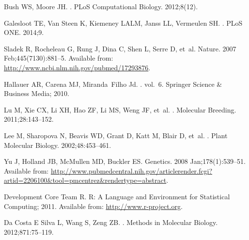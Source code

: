 \documentclass[10pt,letterpaper]{article}
\begin{document}
\begin{thebibliography}{}
Bush WS, Moore JH.
.
\newblock PLoS Computational Biology. 2012;8(12).

Galesloot TE, {Van Steen} K, Kiemeney LALM, Janss LL, Vermeulen SH.
.
\newblock PLoS ONE. 2014;9.

Sladek R, Rocheleau G, Rung J, Dina C, Shen L, Serre D, et~al.
\newblock Nature. 2007 Feb;445(7130):881--5.
\newblock Available from: \url{http://www.ncbi.nlm.nih.gov/pubmed/17293876}.


Hallauer AR, Carena MJ, Miranda~Filho Jd.
. vol.~6.
\newblock Springer Science \& Business Media; 2010.

Lu M, Xie CX, Li XH, Hao ZF, Li MS, Weng JF, et~al.
.
\newblock Molecular Breeding. 2011;28:143--152.

Lee M, Sharopova N, Beavis WD, Grant D, Katt M, Blair D, et~al.
.
\newblock Plant Molecular Biology. 2002;48:453--461.

Yu J, Holland JB, McMullen MD, Buckler ES.
\newblock Genetics. 2008 Jan;178(1):539--51.
\newblock Available from:
  \url{http://www.pubmedcentral.nih.gov/articlerender.fcgi?artid=2206100\&tool=pmcentrez\&rendertype=abstract}.

{Development Core Team} R. {R: A Language and Environment for Statistical
  Computing}; 2011.
\newblock Available from: \url{http://www.r-project.org}.

{Da Costa E  Silva} L, Wang S, Zeng ZB.
.
\newblock Methods in Molecular Biology. 2012;871:75--119.


\end{thebibliography}
\end{document}
